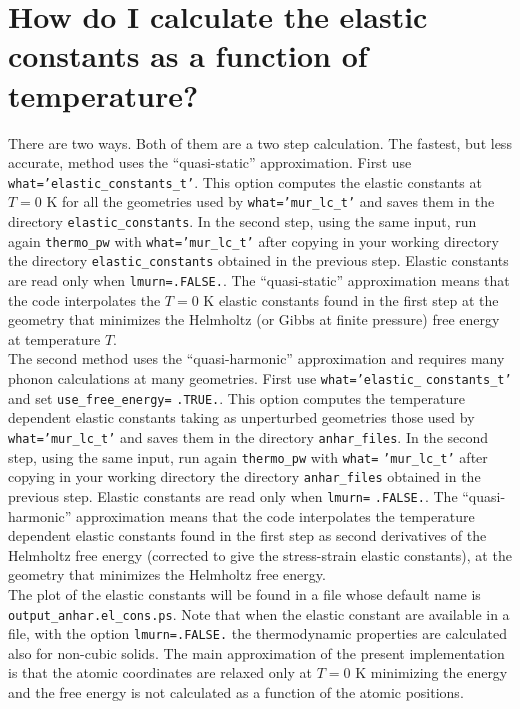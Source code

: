\documentclass[12pt,a4paper]{article}
\begin{document}
\section{\color{coral}How do I calculate the elastic constants 
as a function of temperature?}
There are two ways. Both of them are a two step calculation. 
The fastest, but less accurate, method uses the ``quasi-static'' approximation.
First use 
\texttt{what='elastic\_constants\_t'}. This option computes the elastic
constants at $T=0$ K for all the geometries used by 
\texttt{what='mur\_lc\_t'} and
saves them in the directory \texttt{elastic\_constants}.  
In the second step, using the same input, run again 
\texttt{thermo\_pw} with \texttt{what='mur\_lc\_t'} after copying in your
working directory the directory \texttt{elastic\_constants} obtained 
in the previous step. Elastic constants are read only when
\texttt{lmurn=.FALSE.}.
The ``quasi-static'' approximation means that the code interpolates
the $T=0$ K elastic constants found in the first step at the geometry that
minimizes the Helmholtz (or Gibbs at finite pressure) free energy at
temperature $T$. \\
The second method uses the ``quasi-harmonic'' approximation and
requires many phonon calculations at many geometries.
First use \texttt{what='elastic\_} \texttt{constants\_t'} and set
\texttt{use\_free\_energy=} \texttt{.TRUE.}. This option computes the 
temperature dependent elastic constants taking as unperturbed geometries 
those used by \texttt{what='mur\_lc\_t'} and saves them in the directory 
\texttt{anhar\_files}.  
In the second step, using the same input, run again 
\texttt{thermo\_pw} with \texttt{what=} \texttt{'mur\_lc\_t'} after 
copying in your
working directory the directory \texttt{anhar\_files} obtained 
in the previous step. Elastic constants are read only when
\texttt{lmurn=} \texttt{.FALSE.}. 
The ``quasi-harmonic'' approximation means that the code interpolates
the temperature dependent elastic constants found in the first step as
second derivatives of the Helmholtz free energy (corrected to give the
stress-strain elastic constants), at the geometry that
minimizes the Helmholtz free energy. \\
The plot of the elastic constants will be found in a file whose default
name is \texttt{output\_anhar.el\_cons.ps}.
Note that when the elastic constant are available in a file, 
with the option \texttt{lmurn=.FALSE.} the thermodynamic properties 
are calculated also for non-cubic solids.
The main approximation of the present implementation is that the atomic 
coordinates are relaxed only at $T=0$ K minimizing the energy and
the free energy is 
not calculated as a function of the atomic positions.
\end{document}

